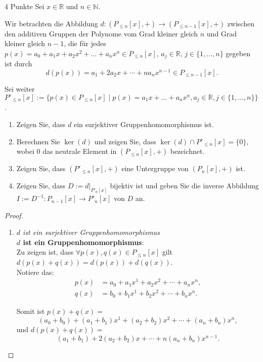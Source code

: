 \documentclass{problemset}
\begin{document}
\begin{problem}{4 Punkte}
Sei $x \in \mathbb{R}$ und $n \in \mathbb{N}$.

Wir betrachten die Abbildung $d: (P_{\le n }[x], +) \to (P_{\le n-1}[x], +)$
zwischen den additiven Gruppen der Polynome vom Grad kleiner gleich $n$ und
Grad kleiner gleich $n - 1$, die für jedes $p(x) = a_0 + a_1x + a_2x^2 + \ldots
    + a_nx^n \in P_{\le n}[x]$, $a_j \in \mathbb{R}$, $j \in \{1, \ldots, n\}$
gegeben ist durch \[
    d(p(x)) = a_1 + 2a_2x + \cdots + na_nx^{n-1} \in P_{\le n-1}[x].
\]

Sei weiter $P'_{\le n}[x] := \{p(x) \in P_{\le n}[x] \mid p(x) = a_1x + \ldots
    + a_nx^n, a_j \in \mathbb{R}, j \in \{1, \ldots, n\}\}$.

\begin{enumerate}
    \item Zeigen Sie, dass $d$ ein surjektiver Gruppenhomomorphismus ist.
    \item Berechnen Sie $\ker(d)$ und zeigen Sie, dass $\ker(d) \cap P'_{\le n}[x] =
              \{0\}$, wobei $0$ das neutrale Element in $(P_{\le n}[x], +)$ bezeichnet.
    \item Zeigen Sie, dass $(P'_{\le n}[x], +)$ eine Untergruppe von $(P_n[x], +)$ ist.
    \item Zeigen Sie, dass $D := d|_{P'_n[x]}$ bijektiv ist und geben Sie die inverse
          Abbildung $I := D^{-1}: P_{n-1}[x] \to P'_n[x]$ von $D$ an.
\end{enumerate}

\begin{proof}
    \begin{enumerate}
        \item \textit{$d$ ist ein surjektiver Gruppenhomomorphismus} \\
              \textbf{$d$ ist ein Gruppenhomomorphismus}: \\
              Zu zeigen ist, dass $\forall p(x),q(x) \in P_{\le n}[x]$ gilt $d(p(x) + q(x)) = d(p(x)) + d(q(x))$. \\

              Notiere das:
              \begin{align}
                  p(x) & = a_0 + a_1x^1 + a_2x^2 + \cdots + a_nx^n, \\
                  q(x) & = b_0 + b_1x^1 + b_2x^2 + \cdots + b_nx^n.
              \end{align}

              Somit ist $p(x) + q(x) =$ \[
                  (a_0+b_0) + (a_1+b_1)x^1 + (a_2 + b_2)x^2 + \cdots + (a_n+b_n)x^n,
              \] und $d(p(x) + q(x)) =$ \[
                  (a_1+b_1) + 2(a_2 + b_2)x + \cdots + n(a_n+b_n)x^{n-1}.
              \]


\end{enumerate}
\end{proof}
\end{problem}
\end{document}
